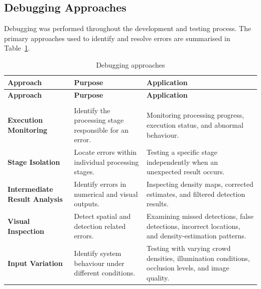 \subsection{Debugging Approaches}

Debugging was performed throughout the development and testing process. The primary approaches used to identify and resolve errors are summarised in Table~\ref{tab:debugging-approaches}.


\begin{longtable}{|>{\raggedright\arraybackslash}p{3.3cm}|>{\raggedright\arraybackslash}p{4.8cm}|>{\raggedright\arraybackslash}p{5.9cm}|}

\caption{Debugging approaches}
\label{tab:debugging-approaches} \\

\hline
\textbf{Approach} & \textbf{Purpose} & \textbf{Application} \\
\hline
\endfirsthead

\hline
\textbf{Approach} & \textbf{Purpose} & \textbf{Application} \\
\hline
\endhead

\hline
\multicolumn{3}{r}{\textit{Continued on next page}} \\
\endfoot

\hline
\endlastfoot

\textbf{Execution Monitoring}
&
Identify the processing stage responsible for an error.
&
Monitoring processing progress, execution status, and abnormal behaviour.
\\
\hline

\textbf{Stage Isolation}
&
Locate errors within individual processing stages.
&
Testing a specific stage independently when an unexpected result occurs.
\\
\hline

\textbf{Intermediate Result Analysis}
&
Identify errors in numerical and visual outputs.
&
Inspecting density maps, corrected estimates, and filtered detection results.
\\
\hline

\textbf{Visual Inspection}
&
Detect spatial and detection related errors.
&
Examining missed detections, false detections, incorrect locations, and density-estimation patterns.
\\
\hline

\textbf{Input Variation}
&
Identify system behaviour under different conditions.
&
Testing with varying crowd densities, illumination conditions, occlusion levels, and image quality.
\\
\hline

\end{longtable}

